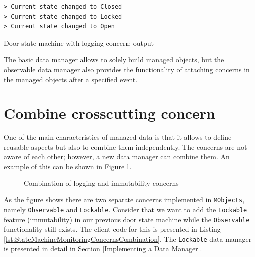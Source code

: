 \begin{sourcecode} [H]
	\lstset{numbers=none}
	\begin{lstlisting}[style=Bash]
> Current state changed to Closed
> Current state changed to Locked
> Current state changed to Open
	\end{lstlisting}
	\caption{Door state machine with logging concern: output}
	\label{lst:StateMachineMonitoringConcernsOutput}
\end{sourcecode}

The basic data manager allows to solely build managed objects, but the observable data manager also provides the functionality of attaching concerns in the managed objects after a specified event.

\section{Combine crosscutting concern}
One of the main characteristics of managed data is that it allows to define reusable aspects but also to combine them independently.
The concerns are not aware of each other; however, a new data manager can combine them.
An example of this can be shown in Figure \ref{fig:concerns_combination}.

\begin{figure}[H]
	\centering
  	\caption{Combination of logging and immutability concerns}
  	\label{fig:concerns_combination}
\end{figure}

As the figure shows there are two separate concerns implemented in \texttt{MObjects}, namely \texttt{Observable} and \texttt{Lockable}.
Consider that we want to add the \texttt{Lockable} feature (immutability) in our previous door state machine while the \texttt{Observable} functionality still exists.
The client code for this is presented in Listing \ref{lst:StateMachineMonitoringConcernsCombination}.
The \texttt{Lockable} data manager is presented in detail in Section \ref{Implementing a Data Manager}.

